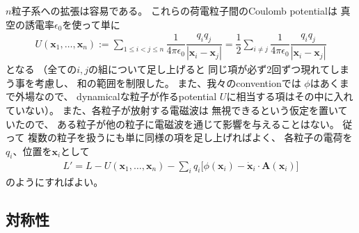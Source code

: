 $n$粒子系への拡張は容易である。
これらの荷電粒子間のCoulomb potentialは
真空の誘電率$\epsilon_0$を使って単に
\begin{align}
  U(\bm{x}_1, \dots, \bm{x}_n)
  :=
  \sum_{1 \le i < j \le n}
  \dfrac{1}{4 \pi \epsilon_0}
  \dfrac{q_i q_j}{|\bm{x}_i - \bm{x}_j|}
  =
  \dfrac{1}{2}
  \sum_{i \neq j}
  \dfrac{1}{4 \pi \epsilon_0}
  \dfrac{q_i q_j}{|\bm{x}_i - \bm{x}_j|}
\end{align}
となる
（全ての$i, j$の組について足し上げると
同じ項が必ず$2$回ずつ現れてしまう事を考慮し、
和の範囲を制限した。
また、我々のconventionでは
$\phi$はあくまで外場なので、
dynamicalな粒子が作るpotential
$U$に相当する項はその中に入れていない）。
また、各粒子が放射する電磁波は
無視できるという仮定を置いていたので、
ある粒子が他の粒子に電磁波を通じて影響を与えることはない。
従って
複数の粒子を扱うにも単に同様の項を足し上げればよく、
各粒子の電荷を$q_i$、位置を$\bm{x}_i$として
\begin{align}
  L' = L
  -
  U(\bm{x}_1, \dots, \bm{x}_n)
  -
  \sum_i
  q_i\Big[
    \phi(\bm{x}_i)
  -
    \dot{\bm{x}}_i \cdot \bm{A}(\bm{x}_i)
  \Big]
\label{many point particle lagrangian with ele-mag potential}
\end{align}
のようにすればよい。

\subsection{対称性}

